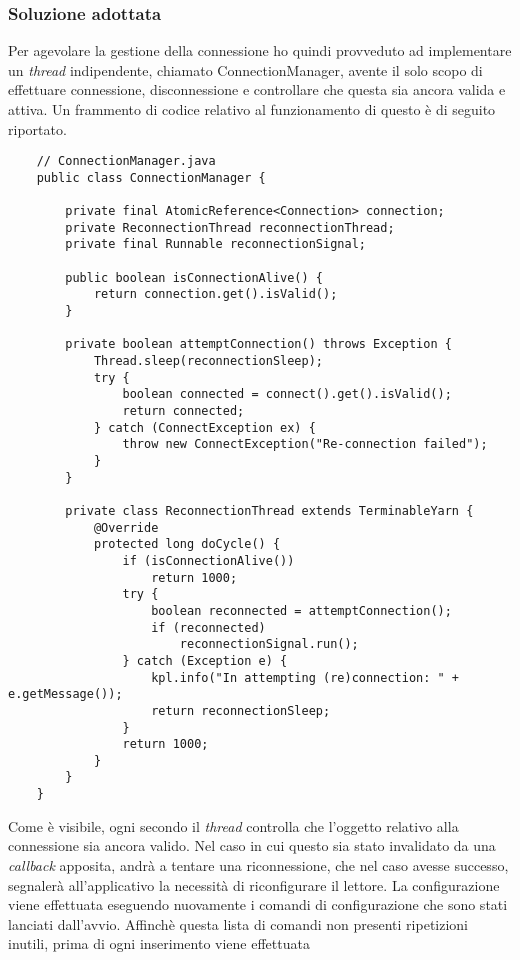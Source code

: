 \subsubsection*{Soluzione adottata}
Per agevolare la gestione della connessione ho quindi provveduto ad implementare un \emph{thread} indipendente,
chiamato ConnectionManager, avente il solo scopo di effettuare connessione, disconnessione e controllare che questa sia ancora valida e attiva.
Un frammento di codice relativo al funzionamento di questo è di seguito riportato. 
\begin{lstlisting}
    // ConnectionManager.java
    public class ConnectionManager {

        private final AtomicReference<Connection> connection;
        private ReconnectionThread reconnectionThread;
        private final Runnable reconnectionSignal;

        public boolean isConnectionAlive() {
		    return connection.get().isValid();
	    }

        private boolean attemptConnection() throws Exception {
		    Thread.sleep(reconnectionSleep);
		    try {
			    boolean connected = connect().get().isValid();
			    return connected;
		    } catch (ConnectException ex) {
			    throw new ConnectException("Re-connection failed");
		    }
	    }

        private class ReconnectionThread extends TerminableYarn {
            @Override
            protected long doCycle() {
                if (isConnectionAlive())
                    return 1000;
                try {
                    boolean reconnected = attemptConnection();
                    if (reconnected)
                        reconnectionSignal.run();
                } catch (Exception e) {
                    kpl.info("In attempting (re)connection: " + e.getMessage());
                    return reconnectionSleep;
                }
                return 1000;
            }
	    }
	}
\end{lstlisting}
Come è visibile, ogni secondo il \emph{thread} controlla che l'oggetto relativo alla connessione sia ancora valido.
Nel caso in cui questo sia stato invalidato da una \emph{callback} apposita, andrà a tentare una riconnessione, che
nel caso avesse successo, segnalerà all'applicativo la necessità di riconfigurare il lettore.
La configurazione viene effettuata eseguendo nuovamente i comandi di configurazione che sono stati lanciati dall'avvio. 
Affinchè questa lista di comandi non presenti ripetizioni inutili, prima di ogni inserimento viene effettuata
